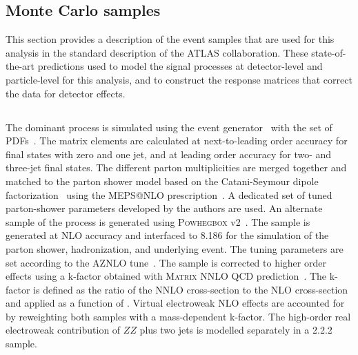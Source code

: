 \subsection{Monte Carlo samples}
\label{sec:montecarlopred}
This section provides a description of the event samples that are used for this analysis in the standard description of the ATLAS collaboration. These state-of-the-art predictions used to model the signal processes at detector-level and particle-level for this analysis, and to construct the response matrices that correct the data for detector effects. 
\subsection{\qqFourL}
The dominant \qqFourL process is simulated using the  event generator~\cite{Bothmann:2019yzt} with the \nnpdfnnlo{} set of PDFs~\cite{Ball:2014uwa}. The matrix elements are calculated at next-to-leading order accuracy for final states with zero and one jet, and at leading order accuracy for two- and three-jet final states. The different parton multiplicities are merged together and matched to the \SHERPA parton shower model based on the Catani-Seymour dipole factorization~\cite{Gleisberg:2008fv} using the MEPS@NLO prescription~\cite{Catani:2001cc,Hoeche:2009r}. A dedicated set of tuned parton-shower parameters developed by the \SHERPA authors are used. 
An alternate sample of the \qqFourL process is generated using  \textsc{Powhegbox} v2~\cite{Alioli:2010xd,Melia:2011tj,Nason:2013ydw}. The sample is generated at NLO accuracy and interfaced to \pythia{} 8.186 for the simulation of the parton shower, hadronization, and underlying event. The tuning parameters are set according to the AZNLO tune~\cite{STDM-2012-23}. The sample is corrected to higher order effects using a k-factor obtained with \textsc{Matrix} NNLO QCD prediction~\cite{Cascioli:2014yka,Grazzini:2015hta,Grazzini:2017mhc,Kallweit:2018nyv}. The k-factor is defined as the ratio of the NNLO cross-section to the NLO cross-section and applied as a function of \mFourL{}. 
Virtual electroweak NLO effects are accounted for by reweighting both samples with a mass-dependent k-factor. The high-order real electroweak contribution of $ZZ$ plus two jets is modelled separately in a \SHERPA{} {2.2.2} sample. 

